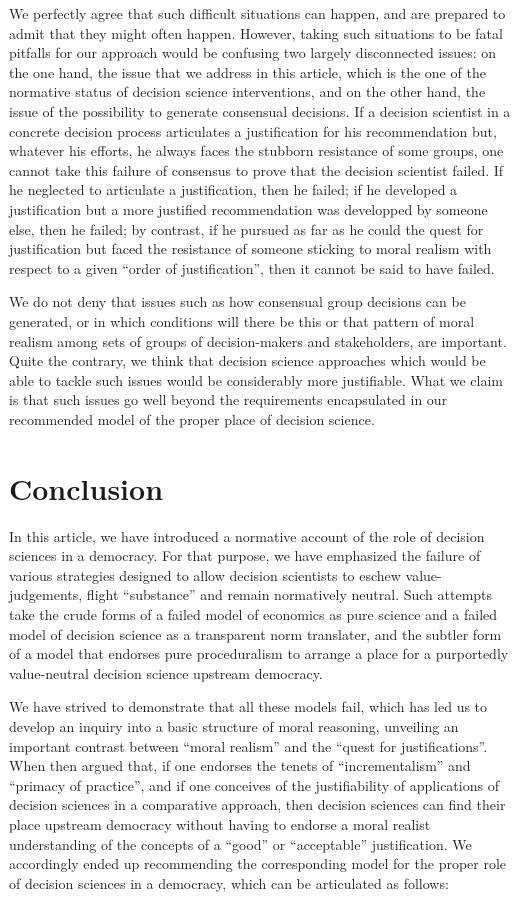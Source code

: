 \documentclass[preprint, french, english, 11pt, authoryear]{elsarticle}%
\begin{document}
We perfectly agree that such difficult situations can happen, and are prepared to admit that they might often happen. However, taking such situations to be fatal pitfalls for our approach would be confusing two largely disconnected issues: on the one hand, the issue that we address in this article, which is the one of the normative status of decision science interventions, and on the other hand, the issue of the possibility to generate consensual decisions. If a decision scientist in a concrete decision process articulates a justification for his recommendation but, whatever his efforts, he always faces the stubborn resistance of some groups, one cannot take this failure of consensus to prove that the decision scientist failed. If he neglected to articulate a justification, then he failed; if he developed a justification but a more justified recommendation was developped by someone else, then he failed; by contrast, if he pursued as far as he could the quest for justification but faced the resistance of someone sticking to moral realism with respect to a given ``order of justification'', then it cannot be said to have failed.

We do not deny that issues such as how consensual group decisions can be generated, or in which conditions will there be this or that pattern of moral realism among sets of groups of decision-makers and stakeholders, are important. Quite the contrary, we think that decision science approaches which would be able to tackle such issues would be considerably more justifiable. What we claim is that such issues go well beyond the requirements encapsulated in our recommended model of the proper place of decision science.

\section{Conclusion}
In this article, we have introduced a normative account of the role of decision sciences in a democracy. For that purpose, we have emphasized the failure of various strategies designed to allow decision scientists to eschew value-judgements, flight ``substance'' and remain normatively neutral. Such attempts take the crude forms of a failed model of economics as pure science and a failed model of decision science as a transparent norm translater, and the subtler form of a model that endorses pure proceduralism to arrange a place for a purportedly value-neutral decision science upstream democracy.

We have strived to demonstrate that all these models fail, which has led us to develop an inquiry into a basic structure of moral reasoning, unveiling an important contrast between ``moral realism'' and the ``quest for justifications''. When then argued that, if one endorses the tenets of ``incrementalism'' and ``primacy of practice'', and if one conceives of the justifiability of applications of decision sciences in a comparative approach, then decision sciences can find their place upstream democracy without having to endorse a moral realist understanding of the concepts of a ``good'' or ``acceptable'' justification. We accordingly ended up recommending the corresponding model for the proper role of decision sciences in a democracy, which can be articulated as follows:
\end{document}
